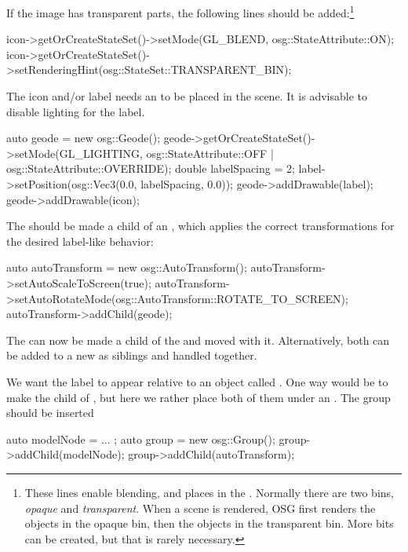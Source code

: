 If the image has transparent parts, the following lines should be added:\footnote{These lines
enable blending, and places  in the . Normally there are
two bins, \textit{opaque} and \textit{transparent}. When a scene is rendered, OSG first
renders the objects in the opaque bin, then the objects in the transparent bin. More bits
can be created, but that is rarely necessary.}

\begin{cpp}
icon->getOrCreateStateSet()->setMode(GL_BLEND, osg::StateAttribute::ON);
icon->getOrCreateStateSet()->setRenderingHint(osg::StateSet::TRANSPARENT_BIN);
\end{cpp}

The icon and/or label needs an  to be placed in the scene.
It is advisable to disable lighting for the label.

\begin{cpp}
auto geode = new osg::Geode();
geode->getOrCreateStateSet()->setMode(GL_LIGHTING,
            osg::StateAttribute::OFF | osg::StateAttribute::OVERRIDE);
double labelSpacing = 2;
label->setPosition(osg::Vec3(0.0, labelSpacing, 0.0));
geode->addDrawable(label);
geode->addDrawable(icon);
\end{cpp}

The  should be made a child of an
, which applies the correct transformations for the
desired label-like behavior:

\begin{cpp}
auto autoTransform = new osg::AutoTransform();
autoTransform->setAutoScaleToScreen(true);
autoTransform->setAutoRotateMode(osg::AutoTransform::ROTATE_TO_SCREEN);
autoTransform->addChild(geode);
\end{cpp}

The  can now be made a child of the 
and moved with it. Alternatively, both can be added to a new 
as siblings and handled together.

We want the label to appear relative to an object called .
One way would be to make  the child of ,
but here we rather place both of them under an . The group should
be inserted

\begin{cpp}
auto modelNode = ... ;
auto group = new osg::Group();
group->addChild(modelNode);
group->addChild(autoTransform);
\end{cpp}

